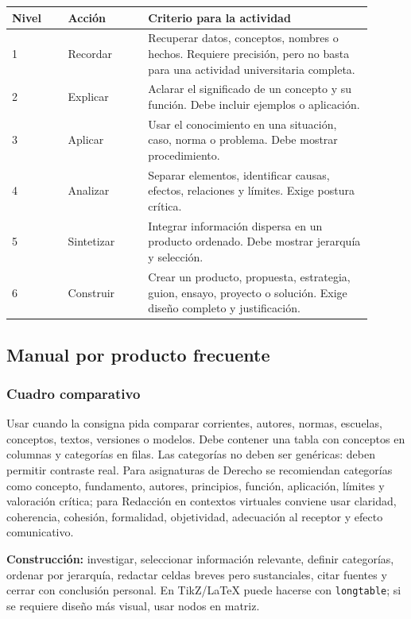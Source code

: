 \begin{longtable}{@{}p{0.14\linewidth}p{0.2\linewidth}p{0.56\linewidth}@{}}
\toprule
\textbf{Nivel} & \textbf{Acción} & \textbf{Criterio para la actividad} \\
\midrule
\endhead
1 & Recordar & Recuperar datos, conceptos, nombres o hechos. Requiere precisión, pero no basta para una actividad universitaria completa. \\
2 & Explicar & Aclarar el significado de un concepto y su función. Debe incluir ejemplos o aplicación. \\
3 & Aplicar & Usar el conocimiento en una situación, caso, norma o problema. Debe mostrar procedimiento. \\
4 & Analizar & Separar elementos, identificar causas, efectos, relaciones y límites. Exige postura crítica. \\
5 & Sintetizar & Integrar información dispersa en un producto ordenado. Debe mostrar jerarquía y selección. \\
6 & Construir & Crear un producto, propuesta, estrategia, guion, ensayo, proyecto o solución. Exige diseño completo y justificación. \\
\bottomrule
\end{longtable}

\subsection{Manual por producto frecuente}

\subsubsection*{Cuadro comparativo}

Usar cuando la consigna pida comparar corrientes, autores, normas, escuelas, conceptos, textos, versiones o modelos. Debe contener una tabla con conceptos en columnas y categorías en filas. Las categorías no deben ser genéricas: deben permitir contraste real. Para asignaturas de Derecho se recomiendan categorías como concepto, fundamento, autores, principios, función, aplicación, límites y valoración crítica; para Redacción en contextos virtuales conviene usar claridad, coherencia, cohesión, formalidad, objetividad, adecuación al receptor y efecto comunicativo.

\textbf{Construcción:} investigar, seleccionar información relevante, definir categorías, ordenar por jerarquía, redactar celdas breves pero sustanciales, citar fuentes y cerrar con conclusión personal. En TikZ/LaTeX puede hacerse con \texttt{longtable}; si se requiere diseño más visual, usar nodos en matriz.

